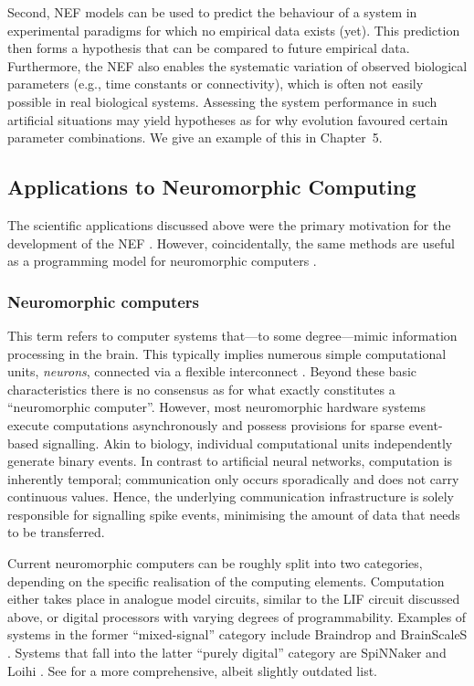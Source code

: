 Second, NEF models can be used to predict the behaviour of a system in experimental paradigms for which no empirical data exists (yet).
This prediction then forms a hypothesis that can be compared to future empirical data.
Furthermore, the NEF also enables the systematic variation of observed biological parameters (e.g., time constants or connectivity), which is often not easily possible in real biological systems.
Assessing the system performance in such artificial situations may yield hypotheses as for why evolution favoured certain parameter combinations.
We give an example of this in Chapter~5.

\subsection{Applications to Neuromorphic Computing}
\label{sec:neuromorphic}

The scientific applications discussed above were the primary motivation for the development of the NEF \citep[Chapter~1]{eliasmith2003neural}.
However, coincidentally, the same methods are useful as a programming model for neuromorphic computers \citep{boahen2017neuromorph}.

\subsubsection{Neuromorphic computers}
This term refers to computer systems that---to some degree---mimic information processing in the brain.
This typically implies numerous simple computational units, \emph{neurons}, connected via a flexible interconnect \citep{furber2016largescale}.
Beyond these basic characteristics there is no consensus as for what exactly constitutes a \enquote{neuromorphic computer}.
However, most neuromorphic hardware systems execute computations asynchronously and possess provisions for sparse event-based signalling.
Akin to biology, individual computational units independently generate binary events.
In contrast to artificial neural networks, computation is inherently temporal; communication only occurs sporadically and does not carry continuous values.
Hence, the underlying communication infrastructure is solely responsible for signalling spike events, minimising the amount of data that needs to be transferred.

Current neuromorphic computers can be roughly split into two categories, depending on the specific realisation of the computing elements.
Computation either takes place in analogue model circuits, similar to the LIF circuit discussed above, or digital processors with varying degrees of programmability.
Examples of systems in the former \enquote{mixed-signal} category include Braindrop \citep{neckar2019braindrop} and BrainScaleS \citep{schemmel2010waferscale}.
Systems that fall into the latter \enquote{purely digital} category are SpiNNaker \citep{furber2013overview} and Loihi \citep{davies2018loihi}. See \citet{furber2016largescale} for a more comprehensive, albeit slightly outdated list.

